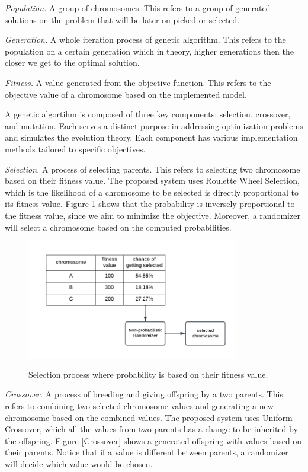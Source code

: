 	\textit{Population.} A group of chromosomes. This refers to a group of generated solutions on the problem that will be later on picked or selected.
	
	\textit{Generation.} A whole iteration process of genetic algorithm. This refers to the population on a certain generation which in theory, higher generations then the closer we get to the optimal solution.
	
	\textit{Fitness.} A value generated from the objective function. This refers to the objective value of a chromosome based on the implemented model.
	
	A genetic algortihm is composed of three key components: selection, crossover, and mutation. Each serves a distinct purpose in addressing optimization problems and simulates the evolution theory. Each component has various implementation methods tailored to specific objectives. \parencite{Eyal2020}
	
	\textit{Selection.} A process of selecting parents. This refers to selecting two chromosome based on their fitness value. The proposed system uses Roulette Wheel Selection, which is the likelihood of a chromosome to be selected is directly proportional to its fitness value. Figure \ref{Selection} shows that the probability is inversely proportional to the fitness value, since we aim to minimize the objective. Moreover, a randomizer will select a chromosome based on the computed probabilities.
	
	\begin{figure}[h!]
		\caption{Selection process where probability is based on their fitness value.}
		\centering
		\includegraphics[width=350px]{Selection}
		\label{Selection}
	\end{figure}
	
	\textit{Crossover.} A process of breeding and giving offspring by a two parents. This refers to combining two selected chromosome values and generating a new chromosome based on the combined values. The proposed system uses Uniform Crossover, which all the values from two parents has a change to be inherited by the offspring. Figure \ref{Crossover} shows a generated offspring with values based on their parents. Notice that if a value is different between parents, a randomizer will decide which value would be chosen.
	
